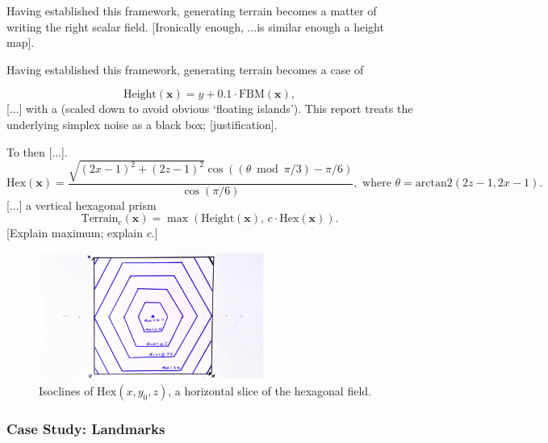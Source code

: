 \documentclass[a4paper, 11pt]{article}
\begin{document}
\begin{flushleft}
Having established this framework, generating terrain becomes a matter of writing the right scalar field. [Ironically enough, ...is similar enough a height map]. %

\vspace{5pt}\noindent
Having established this framework, generating terrain becomes a case of 

$$\textrm{Height}(\mathbf{x}) = y + 0.1\cdot\textrm{FBM}(\mathbf{x}),$$
[...] with a (scaled down to avoid obvious `floating islands'). This report treats the underlying simplex noise as a black box; [justification].

\vspace{5pt}\noindent
To then [...].
$$\textrm{Hex}(\mathbf{x}) = \frac{\sqrt{(2x-1)^2+(2z-1)^2}\cos\left((\theta\bmod\pi/3)-\pi/6\right)}{\cos\left(\pi/6\right)}, \,\, \textrm{where} \,\, \theta = \textrm{arctan2}\left(2z-1, 2x-1\right).$$
[...] a vertical hexagonal prism
$$\textrm{Terrain}_c(\mathbf{x}) = \max\left(\textrm{Height}(\mathbf{x}), \, c\cdot\textrm{Hex}(\mathbf{x})\right).$$
[Explain maximum; explain $c$.]%

\vspace{5pt} 

\vspace{5pt}\noindent
\begin{figure}[h]
\centering
\includegraphics[width=0.66\textwidth]{Hex Field}
\caption{Isoclines of $\textrm{Hex}(x,y_0,z)$, a horizontal slice of the hexagonal field.}
\label{Hex Field}
\end{figure}

\subsubsection{Case Study: Landmarks}


\end{flushleft}
\end{document}
